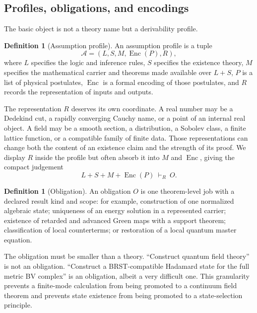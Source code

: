 \documentclass[11pt]{article}
\theoremstyle{definition}
\newtheorem{definition}[proposition]{Definition}
\theoremstyle{remark}
\newcommand{\Enc}{\operatorname{Enc}}
\begin{document}
\subsection{Profiles, obligations, and encodings}

The basic object is not a theory name but a derivability profile.

\begin{definition}[Assumption profile]
An assumption profile is a tuple
\[
       \mathcal A=(L,S,M,\Enc(P),R),
\]
where \(L\) specifies the logic and inference rules, \(S\) specifies the
existence theory, \(M\) specifies the mathematical carrier and theorems made
available over \(L+S\), \(P\) is a list of physical postulates, \(\Enc\) is a
formal encoding of those postulates, and \(R\) records the representation of
inputs and outputs.
\end{definition}

The representation \(R\) deserves its own coordinate.  A real number may be a
Dedekind cut, a rapidly converging Cauchy name, or a point of an internal real
object.  A field may be a smooth section, a distribution, a Sobolev class, a
finite lattice function, or a compatible family of finite data.  Those
representations can change both the content of an existence claim and the
strength of its proof.  We display \(R\) inside the profile but often absorb
it into \(M\) and \(\Enc\), giving the compact judgement
\begin{equation}
       L+S+M+\Enc(P)\ \vdash_R\ O .
       \label{eq:judgement}
\end{equation}

\begin{definition}[Obligation]
An obligation \(O\) is one theorem-level job with a declared result kind and
scope: for example, construction of one normalized algebraic state; uniqueness
of an energy solution in a represented carrier; existence of retarded and
advanced Green maps with a support theorem; classification of local
counterterms; or restoration of a local quantum master equation.
\end{definition}

The obligation must be smaller than a theory.  ``Construct quantum field
theory'' is not an obligation.  ``Construct a BRST-compatible Hadamard state
for the full metric BV complex'' is an obligation, albeit a very difficult
one.  This granularity prevents a finite-mode calculation from being promoted
to a continuum field theorem and prevents state existence from being promoted
to a state-selection principle.
\end{document}
